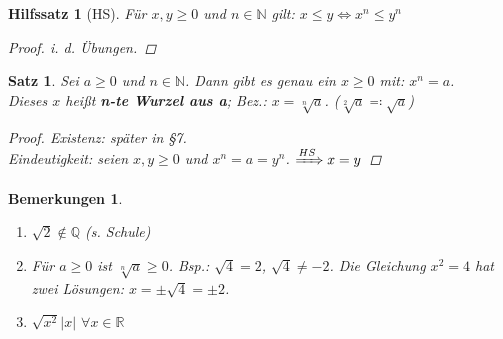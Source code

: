 \documentclass[titlepage,ngerman,a4paper,headsepline,DIV15,halfparskip*,14pt]{scrartcl}
\newcommand{\R}{\mathbb{R}}
\newcommand{\N}{\mathbb{N}}
\newcommand{\Q}{\mathbb{Q}}
\theoremstyle{dotless}
\newtheorem{satz}{Satz}[section]
\newtheorem*{bemerkungen}{Bemerkungen}
\newtheorem*{hilfssatz}{Hilfssatz}
\begin{document}
\begin{hilfssatz}[HS]
	Für $x, y \geq 0$ und $n \in \N$ gilt: $x \leq y \iff x^{n} \leq y^{n}$	

	\begin{proof}
		i. d. Übungen.
	\end{proof}
\end{hilfssatz}

\begin{satz} \label{satz:1.6}
	Sei $a \geq 0$ und $n \in \N$. Dann gibt es genau ein $x \geq 0$ mit: $x^{n} = a$. \\
	Dieses $x$ hei{\ss}t \textbf{n-te Wurzel aus a}; Bez.: $x = \sqrt[n]{a}$. ($\sqrt[2]{a} \eqqcolon \sqrt{a}$)
	
	\begin{proof}
		Existenz: später in \S 7. \\
		Eindeutigkeit: seien $x, y \geq 0$ und $x^{n} = a = y^{n}$. $\xRightarrow[]{HS} x = y$
	\end{proof}
\end{satz}


\begin{bemerkungen}\
	\begin{enumerate}
		\item $\sqrt{2} \notin \Q$ (s. Schule)
		\item Für $a \geq 0$ ist $\sqrt[n]{a} \geq 0$. Bsp.: $\sqrt{4} = 2$, $\sqrt{4} \neq - 2$. Die Gleichung $x^{2} = 4$ hat zwei Lösungen: $x = \pm \sqrt{4} = \pm 2$.
		\item $\sqrt{x^{2}} |x|$ $\forall x \in \R$
	\end{enumerate}
\end{bemerkungen}
\end{document}
